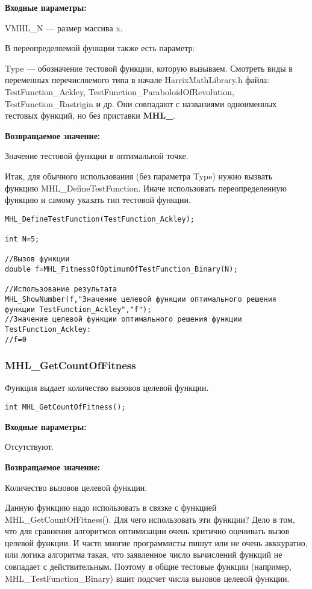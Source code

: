 \documentclass[a4paper,12pt]{article}
\begin{document}
\textbf{Входные параметры:}

VMHL\_N --- размер массива x.

В переопределяемой функции также есть параметр:
  
Type --- обозначение тестовой функции, которую вызываем.
Смотреть виды в переменных перечисляемого типа в начале HarrixMathLibrary.h файла: TestFunction\_Ackley, TestFunction\_ParaboloidOfRevolution, TestFunction\_Rastrigin и др. Они совпадают с названиями одноименных тестовых функций, но без приставки \textbf{MHL\_}.

\textbf{Возвращаемое значение:}
 
Значение тестовой функции в оптимальной точке.

Итак, для обычного использования (без параметра Type) нужно вызвать функцию MHL\_DefineTestFunction. Иначе использовать переопределенную функцию и самому указать тип тестовой функции.


\begin{lstlisting}[label=code_use_MHL_FitnessOfOptimumOfTestFunction_Real,caption=Пример использования]
MHL_DefineTestFunction(TestFunction_Ackley);

int N=5;

//Вызов функции
double f=MHL_FitnessOfOptimumOfTestFunction_Binary(N);

//Использование результата
MHL_ShowNumber(f,"Значение целевой функции оптимального решения функции TestFunction_Ackley","f");
//Значение целевой функции оптимального решения функции TestFunction_Ackley:
//f=0
\end{lstlisting}

\subsubsection{MHL\_GetCountOfFitness}\label{MHL_GetCountOfFitness}

Функция выдает количество вызовов целевой функции.


\begin{lstlisting}[label=code_syntax_MHL_GetCountOfFitness,caption=Синтаксис]
int MHL_GetCountOfFitness();
\end{lstlisting}

\textbf{Входные параметры:}

Отсутствуют.

\textbf{Возвращаемое значение:}
 
Количество вызовов целевой функции.

Данную функцию надо использовать в связке с функцией MHL\_GetCountOfFitness(). Для чего использовать эти функции? Дело в том, что для сравнения алгоритмов оптимизации очень критично оценивать вызов целевой функции. И часто многие программисты пишут или не очень акккуратно, или логика алгоритма такая, что заявленное число вычислений функций не совпадает с действительным. Поэтому в общие тестовые функции (например, MHL\_TestFunction\_Binary) вшит подсчет числа вызовов целевой функции.
\end{document}
